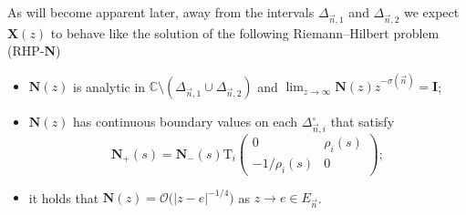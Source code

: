 \documentclass[pdftex]{sigma}
\numberwithin{equation}{section}
\newcommand{\C}		{\mathbb{C}}
\newcommand{\n}{{\vec n}}
\newcommand{\rhn} {\textnormal{RHP}-${\boldsymbol N}$}
\begin{document}
As will become apparent later, away from the intervals $ \Delta_{\n,1} $ and $ \Delta_{\n,2} $ we expect $ \boldsymbol X(z) $ to behave like the solution of the following Riemann--Hilbert problem (\rhn)
\begin{itemize}\itemsep=0pt
\label{rhn}
\item[(a)] $\boldsymbol N(z)$ is analytic in $\C\setminus(\Delta_{\n,1}\cup \Delta_{\n,2})$ and $ \lim_{z\to\infty} {\boldsymbol N}(z)z^{-\sigma(\n)} = {\boldsymbol I}$;
\item[(b)] $\boldsymbol N(z)$ has continuous boundary values on each $\Delta_{\n,i}^\circ$ that satisfy
\[
\boldsymbol N_+(s) = \boldsymbol N_-(s) \mathrm{T}_i \begin{pmatrix} 0 & \rho_i(s) \\ -1/\rho_i(s) & 0 \end{pmatrix};
\]
\item[(c)] it holds that $ \boldsymbol N(z) = \boldsymbol{\mathcal O}\bigl(|z-e|^{-1/4}\bigr) $ as $ z\to e \in E_\n $.
\end{itemize}
\end{document}
